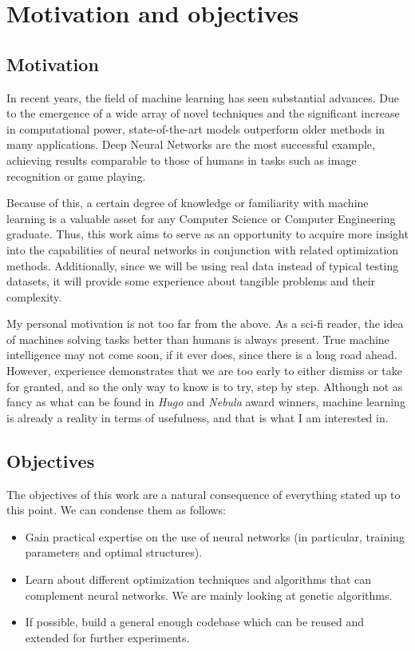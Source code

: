 \chapter{Motivation and objectives}\label{ch:objectives} 

\section{Motivation}

	In recent years, the field of machine learning has seen substantial advances. Due to the emergence of a wide array of novel techniques and the significant increase in computational power, state-of-the-art models outperform older methods in many applications. Deep Neural Networks are the most successful example, achieving results comparable to those of humans in tasks such as image recognition or game playing.

	Because of this, a certain degree of knowledge or familiarity with machine learning is a valuable asset for any Computer Science or Computer Engineering graduate. Thus, this work aims to serve as an opportunity to acquire more insight into the capabilities of neural networks in conjunction with related optimization methods. Additionally, since we will be using real data instead of typical testing datasets, it will provide some experience about tangible problems and their complexity.

	My personal motivation is not too far from the above. As a sci-fi reader, the idea of machines solving tasks better than humans is always present. True machine intelligence may not come soon, if it ever does, since there is a long road ahead. However, experience demonstrates that we are too early to either dismiss or take for granted, and so the only way to know is to try, step by step. Although not as fancy as what can be found in \textit{Hugo} and \textit{Nebula} award winners, machine learning is already a reality in terms of usefulness, and that is what I am interested in.

\section{Objectives}

	The objectives of this work are a natural consequence of everything stated up to this point. We can condense them as follows:

	\begin{itemize}

		\item
		Gain practical expertise on the use of neural networks (in particular, training parameters and optimal structures).

		\item
		Learn about different optimization techniques and algorithms that can complement neural networks. We are mainly looking at genetic algorithms.

		\item
		If possible, build a general enough codebase which can be reused and extended for further experiments.

	\end{itemize}